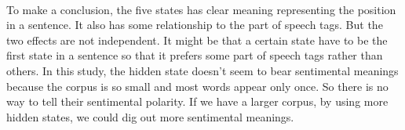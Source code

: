 \paragraph{}
To make a conclusion, the five states has clear meaning representing the position in a sentence. It also has some relationship to the part of speech tags. But the two effects are not independent. It might be that a certain state have to be the first state in a sentence so that it prefers some part of speech tags rather than others. In this study, the hidden state doesn't seem to bear sentimental meanings because the corpus is so small and most words appear only once. So there is no way to tell their sentimental polarity. If we have a larger corpus, by using more hidden states, we could dig out more sentimental meanings. 

